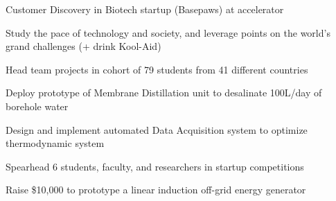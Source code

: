 \documentclass[letterpaper]{deedy-resume} %
\begin{document}
\begin{minipage}[t]{0.66\textwidth}
\sectionspace %



\begin{tightitemize}
    \item Customer Discovery in Biotech startup (Basepaws) at accelerator
    \item Study the pace of technology and society, and leverage points on the world’s grand challenges (+ drink Kool-Aid)
    \item Head team projects in cohort of 79 students from 41 different countries
    
\end{tightitemize}

\sectionspace %



\begin{tightitemize}
    \item Deploy prototype of Membrane Distillation unit to desalinate 100L/day of borehole water
    \item Design and implement automated Data Acquisition system to optimize thermodynamic system
\end{tightitemize}

\sectionspace %



\begin{tightitemize}
    \item Spearhead 6 students, faculty, and researchers in startup competitions
    \item Raise \$10,000 to prototype a linear induction off-grid energy generator
\end{tightitemize}

\sectionspace %



\end{minipage}
\end{document}
